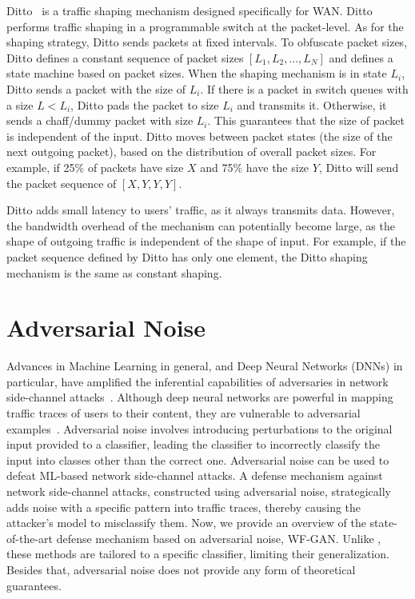 Ditto~\cite{meier2022ditto} is a traffic shaping mechanism designed specifically for WAN.
Ditto performs traffic shaping in a programmable switch at the packet-level.
As for the shaping strategy, Ditto sends packets at fixed intervals.
To obfuscate packet sizes, Ditto defines a constant sequence of packet sizes $[L_1, L_2, \dots, L_N]$ and defines a state machine based on packet sizes.
When the shaping mechanism is in state $L_i$, Ditto sends a packet with the size of $L_i$.
If there is a packet in switch queues with a size $L < L_i$, Ditto pads the packet to size $L_i$ and transmits it.
Otherwise, it sends a chaff/dummy packet with size $L_i$.
This guarantees that the size of packet is independent of the input.
Ditto moves between packet states (the size of the next outgoing packet), based on the distribution of overall packet sizes.
For example, if 25\% of packets have size $X$ and 75\% have the size $Y$, Ditto will send the packet sequence of $[X, Y, Y, Y]$.

Ditto adds small latency to users' traffic, as it always transmits data.
However, the bandwidth overhead of the mechanism can potentially become large, as the shape of outgoing traffic is independent of the shape of input.
For example, if the packet sequence defined by Ditto has only one element, the Ditto shaping mechanism is the same as constant shaping.  

\section{Adversarial Noise}\label{subsec:adversarial-noise}
Advances in Machine Learning in general, and Deep Neural Networks (DNNs) in particular, have amplified the inferential capabilities of adversaries in network side-channel attacks~\cite{sirinam2018df}.
Although deep neural networks are powerful in mapping traffic traces of users to their content, they are vulnerable to adversarial examples~\cite{goodfellow2014explaining}.
Adversarial noise involves introducing perturbations to the original input provided to a classifier, leading the classifier to incorrectly classify the input into classes other than the correct one.
Adversarial noise can be used to defeat ML-based network side-channel attacks.
A defense mechanism against network side-channel attacks, constructed using adversarial noise, strategically adds noise with a specific pattern into traffic traces, thereby causing the attacker's model to misclassify them.
Now, we provide an overview of the state-of-the-art defense mechanism based on adversarial noise, WF-GAN. 
Unlike {\sys}, these methods are tailored to a specific classifier, limiting their generalization.
Besides that, adversarial noise does not provide any form of theoretical guarantees.

